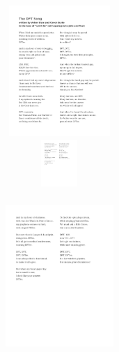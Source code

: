 \frame
{
	\frametitle{}
\begin{figure}[h!]
	\vspace{-10pt}
\centering
\includegraphics[height=1.95in,width=3.8in,viewport=0 80 550 352,clip]{Figures/DFT_song-1.pdf}
\includegraphics[height=0.70in,width=3.8in,viewport=0 650 550 750,clip]{Figures/DFT_song-2.pdf}
\label{DFT_Song_02}
\end{figure}
}

\frame
{
	\frametitle{}
\begin{figure}[h!]
	\vspace{-10pt}
\centering
\includegraphics[height=2.10in,width=3.8in,viewport=0 350 550 650,clip]{Figures/DFT_song-2.pdf}
\label{DFT_Song_03}
\end{figure}
}
